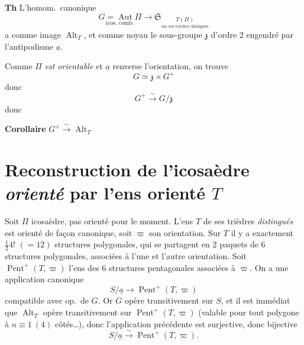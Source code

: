 \documentclass[11pt,a4paper]{article}
\begin{document}
\textbf{Th} L'homom.\ canonique
\[
  \underset{\text{icos.\ comb.}}{G = \operatorname{Aut}\Pi}
  \longrightarrow
  \mathfrak{S}_{\underset{\text{ens des trièdres distingués}}{T(\Pi)}}
\]
a comme image $\operatorname{Alt}_T$, et comme noyau le sous-groupe
$\mathfrak{z}$
d'ordre $2$ engendré par l'antipodisme $\underline{a}$.

Comme \struck{\ill{}} $\Pi$ \emph{est orientable} et $\underline{a}$ renverse
l'orientation, on trouve
\[
  G \simeq \mathfrak{z} \times G^{+}
\]
donc
\[
  G^{+} \xrightarrow{\sim} G/\mathfrak{z}
\]
donc


\textbf{Corollaire} $G^{+} \xrightarrow{\sim} \operatorname{Alt}_T$

\section*{Reconstruction de l'icosaèdre \emph{orienté} par l'ens orienté $T$}

Soit $\Pi$ icosaèdre, \struck{\ill{}} pas orienté pour le moment. L'ens $T$
de ses trièdres \emph{distingués} est orienté de façon canonique, soit
$\varpi$ son orientation. Sur $T$ il y a exactement $\frac12 4!$ $(=12)$
structures polygonales, qui se partagent en $2$ paquets de $6$ structures
polygonales, associées à l'une et l'autre orientation. Soit
$\operatorname{Pent}^{+}(T, \varpi)$ l'ens des $6$ structures pentagonales
associées à $\varpi$. On a une application canonique
\[
  S/\underline{a} \longrightarrow \operatorname{Pent}^{+}(T, \varpi)
\]
compatible avec op.\ de $G$. Or $G$ opère transitivement sur $S$, et il est
immédiat que $\operatorname{Alt}_T$ opère transitivement sur
$\operatorname{Pent}^{+}(T, \varpi)$ (valable pour tout polygone à $n \equiv 1
\ (4)$ côtés…), donc l'application précédente est surjective, donc
bijective
\[
  S/\underline{a} \xrightarrow{\sim} \operatorname{Pent}^{+}(T, \varpi) .
\]

\end{document}
